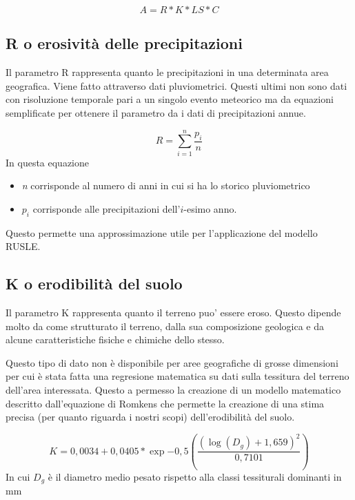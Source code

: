 \begin{equation} \label{eq:main_not_P}
A = R * K * LS * C
\end{equation}

\subsection{R o erosività delle precipitazioni}
Il parametro R rappresenta quanto le precipitazioni in una determinata area geografica. Viene fatto attraverso dati pluviometrici. Questi ultimi non sono dati con risoluzione temporale pari a un singolo evento meteorico ma da equazioni semplificate per ottenere il parametro da i dati di precipitazioni annue.

\begin{equation}\label{eq:r}
	R = \sum_{i=1}^{n} \frac{p_i}{n}
\end{equation}
In questa equazione
\begin{itemize}
	\item \textit{n} corrisponde al numero di anni in cui si ha lo storico pluviometrico
	\item \textit{$p_i$} corrisponde alle precipitazioni dell'$i$-esimo anno.
\end{itemize}

Questo permette una approssimazione utile per l'applicazione del modello RUSLE.

\subsection{K o erodibilità del suolo}
Il parametro K rappresenta quanto il terreno puo' essere eroso. Questo dipende molto da come  strutturato il terreno, dalla sua composizione geologica e da alcune caratteristiche fisiche e chimiche dello stesso.

Questo tipo di dato non è disponibile per aree geografiche di grosse dimensioni per cui è stata fatta una regresione matematica su dati sulla tessitura del terreno dell'area interessata. Questo a permesso la creazione di un modello matematico descritto dall'equazione di Romkens che permette la creazione di una stima precisa (per quanto riguarda i nostri scopi) dell'erodibilità del suolo.

\begin{equation}\label{eq:k}
	K=0,0034 + 0,0405 * \exp{-0,5\left( \dfrac{(\log(D_g)+1,659)^2}{0,7101} \right) }
\end{equation}
In cui $D_g$ è il diametro medio pesato rispetto alla classi tessiturali dominanti in mm


